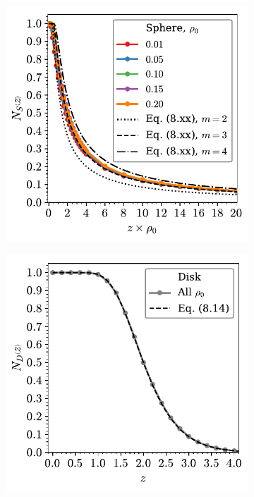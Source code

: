 \begin{figure}

	\begin{subfigure}[b]{0.48\textwidth}
         \centering
         \includegraphics[width=\textwidth]{./figures/quasi2d/n_z_3d_sphere1.pdf}
         \caption{}
         \label{fig:nphia}
     \end{subfigure}
     \hfill
     \begin{subfigure}[b]{0.48\textwidth}
         \centering
         \includegraphics[width=\textwidth]{./figures/quasi2d/n_z_3d_disk.pdf}
         \caption{}
         \label{fig:nphib}
     \end{subfigure}
     \hfill
     

\end{figure}
